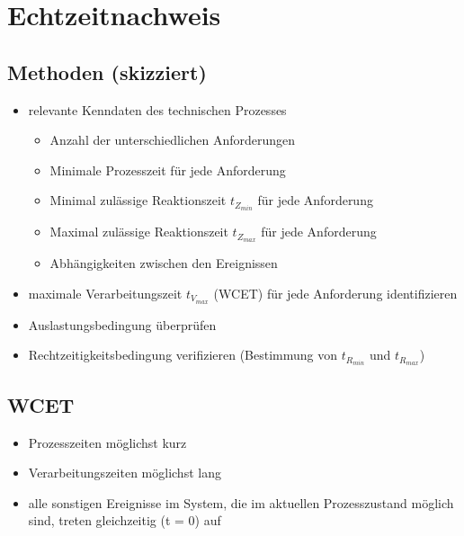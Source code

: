 \section{Echtzeitnachweis}
\subsection{Methoden (skizziert)}
\begin{itemize}
	\item relevante Kenndaten des technischen Prozesses
	\begin{itemize}
		\item Anzahl der unterschiedlichen Anforderungen
		\item Minimale Prozesszeit für jede Anforderung
		\item Minimal zulässige Reaktionszeit $t_{Z_{min}}$ für jede Anforderung
		\item Maximal zulässige Reaktionszeit $t_{Z_{max}}$ für jede Anforderung
		\item Abhängigkeiten zwischen den Ereignissen
	\end{itemize}

	\item maximale Verarbeitungszeit $t_{V_{max}}$ (WCET) für jede Anforderung identifizieren
	
	\item Auslastungsbedingung überprüfen

	\item Rechtzeitigkeitsbedingung verifizieren (Bestimmung von $t_{R_{min}}$ und $t_{R_{max}}$)
\end{itemize}

\subsection{WCET}
\begin{itemize}
	\item Prozesszeiten möglichst kurz
	\item Verarbeitungszeiten möglichst lang 
	\item alle sonstigen Ereignisse im System, die im aktuellen
Prozesszustand möglich sind, treten gleichzeitig (t = 0) auf
\end{itemize}

